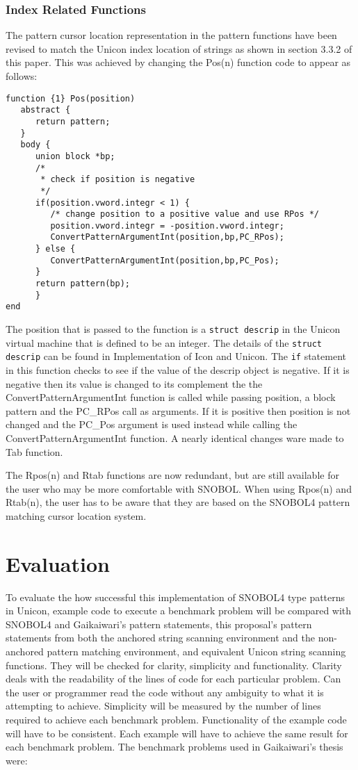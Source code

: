 \documentclass{article}
\begin{document}
\subsubsection{Index Related Functions}
The pattern cursor location representation in the pattern functions have been revised to match the Unicon index location of strings as shown in section 3.3.2 of this paper.  This was achieved by changing the Pos(n) function code to appear as follows:
\begin{verbatim}
function {1} Pos(position)
   abstract {
      return pattern;
   }
   body {
      union block *bp;
      /*
       * check if position is negative
       */
      if(position.vword.integr < 1) {
         /* change position to a positive value and use RPos */
         position.vword.integr = -position.vword.integr;
         ConvertPatternArgumentInt(position,bp,PC_RPos);
      } else {
         ConvertPatternArgumentInt(position,bp,PC_Pos);
      }
      return pattern(bp);
      }
end
\end{verbatim}
The position that is passed to the function is a \texttt{struct descrip} in the Unicon virtual machine that is defined to be an integer.  The details of the \texttt{struct descrip} can be found in Implementation of Icon and Unicon. \cite{JefferyImp}  The \texttt{if} statement in this function checks to see if the value of the descrip object is negative.  If it is negative then its value is changed to its complement the the ConvertPatternArgumentInt function is called while passing position, a block pattern and the PC\_RPos call as arguments.  If it is positive then position is not changed and the PC\_Pos argument is used instead while calling the ConvertPatternArgumentInt function.  A nearly identical changes ware made to Tab function.

The Rpos(n) and Rtab functions are now redundant, but are still available for the user who may be more comfortable with SNOBOL.  When using Rpos(n) and Rtab(n), the user has to be aware that they are based on the SNOBOL4 pattern matching cursor location system.

\section{Evaluation}
To evaluate the how successful this implementation of SNOBOL4 type patterns in Unicon, example code to execute a benchmark problem will be compared with SNOBOL4 and Gaikaiwari's pattern statements, this proposal's pattern statements  from both the anchored string scanning environment and the non-anchored pattern matching environment, and equivalent Unicon string scanning functions.  They will be checked for clarity, simplicity and functionality.  Clarity deals with the readability of the lines of code for each particular problem.  Can the user or programmer read the code without any ambiguity to what it is attempting to achieve.  Simplicity will be measured by the number of lines required to achieve each benchmark problem.  Functionality of the example code will have to be consistent.  Each example will have to achieve the same result for each benchmark problem.  The benchmark problems used in Gaikaiwari's thesis were:
\end{document}

